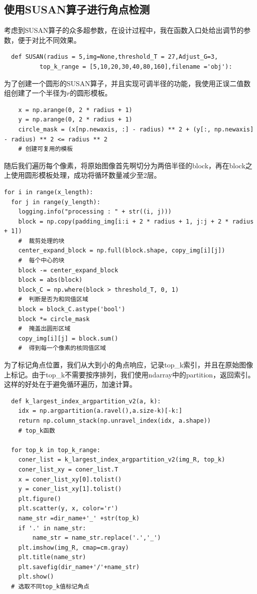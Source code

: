 \documentclass[a4paper,11pt,UTF8]{ctexart}
\begin{document}
\subsection{使用SUSAN算子进行角点检测}
考虑到SUSAN算子的众多超参数，在设计过程中，我在函数入口处给出调节的参数，便于对比不同效果。
\begin{lstlisting}
  def SUSAN(radius = 5,img=None,threshold_T = 27,Adjust_G=3,
          top_k_range = [5,10,20,30,40,80,160],filename ='obj'):
\end{lstlisting}

为了创建一个圆形的SUSAN算子，并且实现可调半径的功能，我使用正误二值数组创建了一个半径为$r$的圆形模板。
\begin{lstlisting}
    x = np.arange(0, 2 * radius + 1)
    y = np.arange(0, 2 * radius + 1)
    circle_mask = (x[np.newaxis, :] - radius) ** 2 + (y[:, np.newaxis] - radius) ** 2 <= radius ** 2
    # 创建可复用的模板
\end{lstlisting}

随后我们遍历每个像素，将原始图像首先啊切分为两倍半径的block，再在block之上使用圆形模板处理，成功将循环数量减少至2层。
\begin{lstlisting}
for i in range(x_length):
  for j in range(y_length):
    logging.info("processing : " + str((i, j)))
    block = np.copy(padding_img[i:i + 2 * radius + 1, j:j + 2 * radius + 1])
    #  裁剪处理的块
    center_expand_block = np.full(block.shape, copy_img[i][j])
    #  每个中心的块
    block -= center_expand_block
    block = abs(block)
    block_C = np.where(block > threshold_T, 0, 1)
    #  判断是否为和同值区域
    block = block_C.astype('bool')
    block *= circle_mask
    #  掩盖出圆形区域
    copy_img[i][j] = block.sum()
    #  得到每一个像素的核同值区域
\end{lstlisting}

为了标记角点位置，我们从大到小的角点响应，记录top\_k索引，并且在原始图像上标记。由于top\_k不需要按序排列，我们使用ndarray中的partition，返回索引。这样的好处在于避免循环遍历，加速计算。
\begin{lstlisting}
  def k_largest_index_argpartition_v2(a, k):
    idx = np.argpartition(a.ravel(),a.size-k)[-k:]
    return np.column_stack(np.unravel_index(idx, a.shape))
    # top_k函数
  
  for top_k in top_k_range:
    coner_list = k_largest_index_argpartition_v2(img_R, top_k)
    coner_list_xy = coner_list.T
    x = coner_list_xy[0].tolist()
    y = coner_list_xy[1].tolist()
    plt.figure()
    plt.scatter(y, x, color='r')
    name_str =dir_name+'_' +str(top_k)
    if '.' in name_str:
        name_str = name_str.replace('.','_')
    plt.imshow(img_R, cmap=cm.gray)
    plt.title(name_str)
    plt.savefig(dir_name+'/'+name_str)
    plt.show()
  # 选取不同top_k值标记角点
\end{lstlisting}
\end{document}
